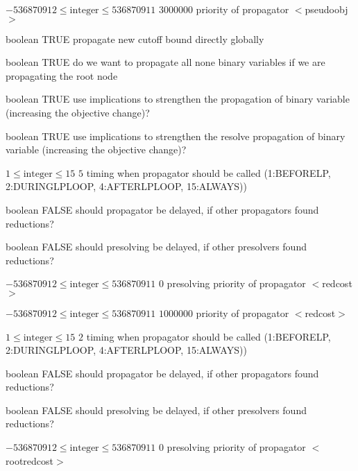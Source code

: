%
{$-536870912\leq\textrm{integer}\leq536870911$}%
{$3000000$}%
{priority of propagator $<$pseudoobj$>$}%
{}

%
{boolean}%
{TRUE}%
{propagate new cutoff bound directly globally}%
{}

%
{boolean}%
{TRUE}%
{do we want to propagate all none binary variables if we are propagating the root node}%
{}

%
{boolean}%
{TRUE}%
{use implications to strengthen the propagation of binary variable (increasing the objective change)?}%
{}

%
{boolean}%
{TRUE}%
{use implications to strengthen the resolve propagation of binary variable (increasing the objective change)?}%
{}

%
{$1\leq\textrm{integer}\leq15$}%
{$5$}%
{timing when propagator should be called (1:BEFORELP, 2:DURINGLPLOOP, 4:AFTERLPLOOP, 15:ALWAYS))}%
{}

%
{boolean}%
{FALSE}%
{should propagator be delayed, if other propagators found reductions?}%
{}

%
{boolean}%
{FALSE}%
{should presolving be delayed, if other presolvers found reductions?}%
{}

%
{$-536870912\leq\textrm{integer}\leq536870911$}%
{$0$}%
{presolving priority of propagator $<$redcost$>$}%
{}

%
{$-536870912\leq\textrm{integer}\leq536870911$}%
{$1000000$}%
{priority of propagator $<$redcost$>$}%
{}

%
{$1\leq\textrm{integer}\leq15$}%
{$2$}%
{timing when propagator should be called (1:BEFORELP, 2:DURINGLPLOOP, 4:AFTERLPLOOP, 15:ALWAYS))}%
{}

%
{boolean}%
{FALSE}%
{should propagator be delayed, if other propagators found reductions?}%
{}

%
{boolean}%
{FALSE}%
{should presolving be delayed, if other presolvers found reductions?}%
{}

%
{$-536870912\leq\textrm{integer}\leq536870911$}%
{$0$}%
{presolving priority of propagator $<$rootredcost$>$}%
{}

